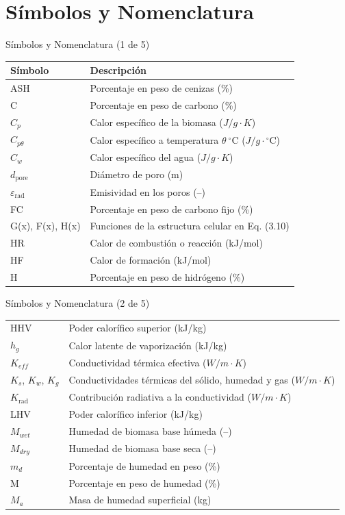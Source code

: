 \documentclass[../../main.tex]{subfiles}
\begin{document}
\section{Símbolos y Nomenclatura}

\begin{frame}{Símbolos y Nomenclatura (1 de 5)}
\small
\begin{tabularx}{\textwidth}{lX}
\textbf{Símbolo} & \textbf{Descripción} \\ \hline
ASH & Porcentaje en peso de cenizas (\%) \\
C & Porcentaje en peso de carbono (\%) \\
$C_p$ & Calor específico de la biomasa ($J/g\cdot K$) \\
$C_{p\theta}$ & Calor específico a temperatura $\theta\ ^\circ\mathrm{C}$ ($J/g\cdot{}^\circ\mathrm{C}$) \\
$C_w$ & Calor específico del agua ($J/g\cdot K$) \\
$d_{\text{pore}}$ & Diámetro de poro (m) \\
$\varepsilon_{\text{rad}}$ & Emisividad en los poros (–) \\
FC & Porcentaje en peso de carbono fijo (\%) \\
G(x), F(x), H(x) & Funciones de la estructura celular en Eq. (3.10) \\
HR & Calor de combustión o reacción (kJ/mol) \\
HF & Calor de formación (kJ/mol) \\
H & Porcentaje en peso de hidrógeno (\%) \\
\end{tabularx}
\end{frame}

\begin{frame}{Símbolos y Nomenclatura (2 de 5)}
\small
\begin{tabular}{ll}
HHV & Poder calorífico superior (kJ/kg) \\
$h_g$ & Calor latente de vaporización (kJ/kg) \\
$K_{eff}$ & Conductividad térmica efectiva ($W/m\cdot K$) \\
$K_s$, $K_w$, $K_g$ & Conductividades térmicas del sólido, humedad y gas ($W/m\cdot K$) \\
$K_\text{rad}$ & Contribución radiativa a la conductividad ($W/m\cdot K$) \\
LHV & Poder calorífico inferior (kJ/kg) \\
$M_{wet}$ & Humedad de biomasa base húmeda (–) \\
$M_{dry}$ & Humedad de biomasa base seca (–) \\
$m_d$ & Porcentaje de humedad en peso (\%) \\
M & Porcentaje en peso de humedad (\%) \\
$M_a$ & Masa de humedad superficial (kg) \\
\end{tabular}
\end{frame}
\end{document}
